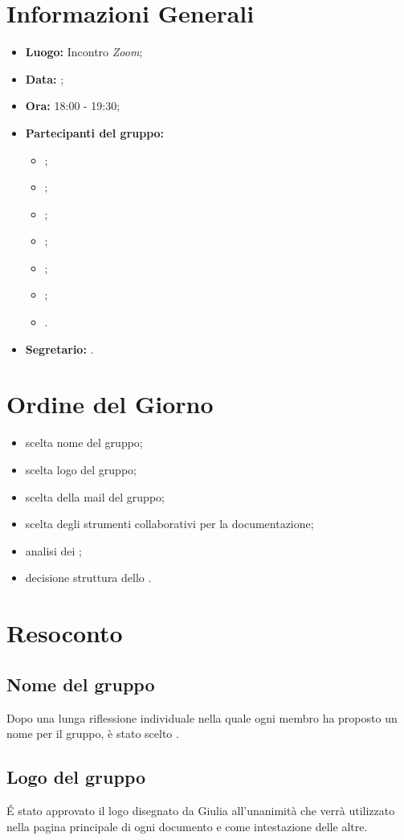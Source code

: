 \section{Informazioni Generali}
\begin{itemize}
\item \textbf{Luogo:} Incontro \textit{Zoom};
\item \textbf{Data:} \Data;
\item \textbf{Ora:} 18:00 - 19:30;
\item \textbf{Partecipanti del gruppo:}
	\begin{itemize}
		\item \BL{}; 
		\item \FF{};
		\item \MM{}; 
		\item \PC{};
		\item \TG{};
		\item \TL{};
		\item \VD{}.
	\end{itemize} 
\item \textbf{Segretario:} \PC{}.
\end{itemize}

\section{Ordine del Giorno}
\begin{itemize}
 \item scelta nome del gruppo;
 \item scelta logo del gruppo;
 \item scelta della mail del gruppo;
 \item scelta degli strumenti collaborativi per la documentazione;
 \item analisi dei ;
 \item decisione struttura dello \textit{\SdF}.
\end{itemize}

\section{Resoconto}
\subsection{Nome del gruppo}
Dopo una lunga riflessione individuale nella quale ogni membro ha proposto un nome per il gruppo, è stato scelto {\Gruppo}.

\subsection{Logo del gruppo}
É stato approvato il logo disegnato da Giulia all'unanimità che verrà utilizzato nella pagina principale di ogni documento e come intestazione delle altre.

